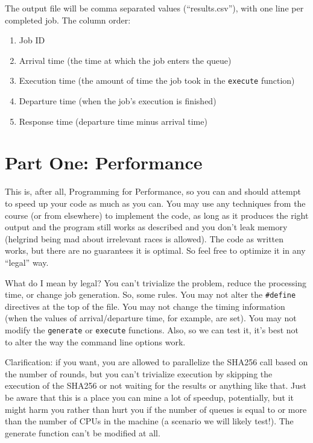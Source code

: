 \documentclass[letterpaper,10pt]{article}
\begin{document}
The output file will be comma separated values (``results.csv''), with one line per completed job. The column order:
\begin{enumerate}
	\item Job ID
	\item Arrival time (the time at which the job enters the queue)
	\item Execution time (the amount of time the job took in the \texttt{execute} function)
	\item Departure time (when the job's execution is finished)
	\item Response time (departure time minus arrival time)
\end{enumerate}


\section*{Part One: Performance}

This is, after all, Programming for Performance, so you can and should attempt to speed up your code as much as you can. You may use any techniques from the course (or from elsewhere) to implement the code, as long as it produces the right output and the program still works as described and you don't leak memory (helgrind being mad about irrelevant races is allowed). The code as written works, but there are no guarantees it is optimal. So feel free to optimize it in any ``legal'' way.

What do I mean by legal? You can't trivialize the problem, reduce the processing time, or change job generation. So, some rules. You may not alter the \texttt{\#define} directives at the top of the file. You may not change the timing information (when the values of arrival/departure time, for example, are set). You may not modify the \texttt{generate} or \texttt{execute} functions. Also, so we can test it, it's best not to alter the way the command line options work.

Clarification: if you want, you are allowed to parallelize the SHA256 call based on the number of rounds, but you can't trivialize execution by skipping the execution of the SHA256 or not waiting for the results or anything like that. Just be aware that this is a place you can mine a lot of speedup, potentially, but it might harm you rather than hurt you if the number of queues is equal to or more than the number of CPUs in the machine (a scenario we will likely test!). The generate function can't be modified at all. 
\end{document}
